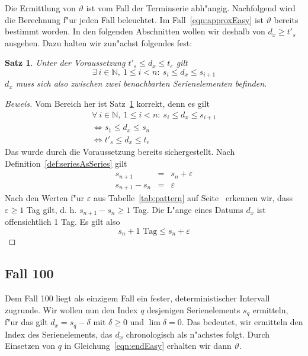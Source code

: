 \documentclass[a4paper]{article}
\numberwithin{equation}{section}
\newtheorem{thm}{Satz}
\begin{document}
\noindent Die Ermittlung von $\vartheta$ ist vom Fall der Terminserie abh"angig.
Nachfolgend wird die Berechnung f"ur jeden Fall beleuchtet. Im
Fall~\eqref{eqn:approxEasy} ist $\vartheta$ bereits bestimmt worden. In den
folgenden Abschnitten wollen wir deshalb von $d_x \ge t'_s$ ausgehen. Dazu
halten wir zun"achst folgendes fest:
\begin{thm}\label{thm:dBetweenElems}
  Unter der Voraussetzung $t'_s \le d_x \le t_e$ gilt
  \begin{equation}
    \exists\ i \in \mathbb{N},\ 1 \le i < n :\ s_i \le d_x \le s_{i+1}
  \end{equation}
  $d_x$ muss sich also zwischen zwei benachbarten Serienelementen befinden.
\end{thm}
\begin{proof}[Beweis]
  Vom Bereich her ist Satz~\ref{thm:dBetweenElems} korrekt, denn es gilt
  \begin{gather}
    \forall\ i \in \mathbb{N},\ 1 \le i < n :\ s_i \le d_x \le s_{i+1} \\
    \Leftrightarrow s_1 \le d_x \le s_n \\
    \Leftrightarrow t'_s \le d_x \le t_e
  \end{gather}
  Das wurde durch die Voraussetzung bereits sichergestellt. Nach
  Definition~\ref{def:seriesAsSeries} gilt
  \begin{eqnarray}
    s_{n+1} &=& s_n + \varepsilon \\
    s_{n+1} - s_n &=& \varepsilon
  \end{eqnarray}
  Nach den Werten f"ur $\varepsilon$ aus Tabelle~\ref{tab:pattern} auf
  Seite~\pageref{tab:pattern} erkennen wir, dass $\varepsilon \ge 1$ Tag gilt,
  d. h. $s_{n+1} - s_n \ge 1$ Tag. Die L"ange eines Datums $d_x$ ist
  offensichtlich 1 Tag. Es gilt also
  \begin{equation}s_n + 1 \textrm{ Tag} \le s_n + \varepsilon\end{equation}
\end{proof}


%
%
\subsection{Fall 100}
Dem Fall 100 liegt als einzigem Fall ein fester, deterministischer Intervall
zugrunde. Wir wollen nun den Index $q$ desjenigen Serienelements $s_q$
ermitteln, f"ur das gilt $d_x = s_q - \delta$ mit $\delta \ge 0$ und
$\lim \delta = 0$. Das bedeutet, wir ermitteln den Index des Serienelements, das
$d_x$ chronologisch als n"achstes folgt. Durch Einsetzen von $q$ in
Gleichung~\eqref{eqn:endEasy} erhalten wir dann $\vartheta$.
\end{document}

